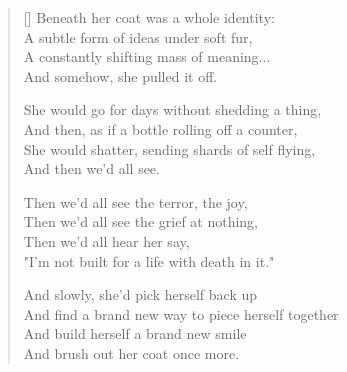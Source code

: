\begin{verse}[\textwidth]
Beneath her coat was a whole identity:\\
A subtle form of ideas under soft fur,\\
A constantly shifting mass of meaning...\\
And somehow, she pulled it off.

She would go for days without shedding a thing,\\
And then, as if a bottle rolling off a counter,\\
She would shatter, sending shards of self flying,\\
And then we'd all see.

Then we'd all see the terror, the joy,\\
Then we'd all see the grief at nothing,\\
Then we'd all hear her say,\\
"I'm not built for a life with death in it."

And slowly, she'd pick herself back up\\
And find a brand new way to piece herself together\\
And build herself a brand new smile\\
And brush out her coat once more.
\end{verse}

